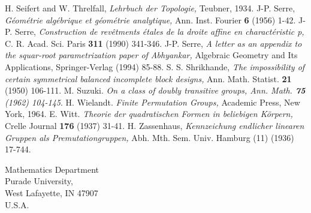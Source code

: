 \begin{thebibliography}{99}
 H. Seifert and W. Threlfall, \textit{Lehrbuch der Topologie,} Teubner, 1934.
 J-P. Serre, \textit{G\'eom\'etrie alg\'ebrique et g\'eom\'etrie analytique,} Ann. Inst. Fourier {\bf 6} (1956) 1-42.
 J-P. Serre, \textit{Construction de rev\^etments \'etales de la droite affine en charact\'eristic p,} C. R. Acad. Sci. Paris {\bf 311} (1990) 341-346.
J-P. Serre, \textit{A letter as an appendix to the squar-root parametrization paper of Abhyankar,} Algebraic Geometry and Its Applications, Springer-Verlag (1994) 85-88.
 S. S. Shrikhande, \textit{The impossibility of certain symmetrical balanced incomplete block designs,} Ann. Math. Statist. {\bf 21} (1950) 106-111.
 M. Suzuki. \textit{On a class of doubly transitive groups, Ann. Math. {\bf 75} (1962) 104-145}.
 H. Wielandt. \textit{Finite Permutation Groups,} Academic Press, New York, 1964.
 E. Witt. \textit{Theorie der quadratischen Formen in beliebigen K\"orpern,} Crelle Journal {\bf 176} (1937) 31-41.
 H. Zassenhaus, \textit{Kennzeichung endlicher linearen Gruppen als Premutationgruppen,} Abh. Mth. Sem. Univ. Hamburg {\rm (11)} (1936) 17-744.
\end{thebibliography}

\bigskip
\begin{flushleft}
Mathematics Department\\
Purade University,\\
West Lafayette, IN 47907\\
U.S.A.
\end{flushleft}
